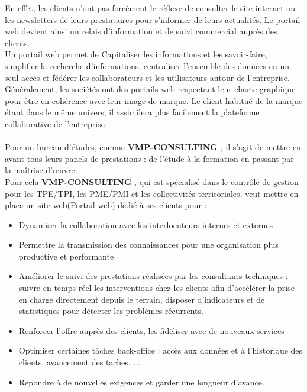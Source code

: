 \documentclass[12pt]{article}
\begin{document}
En effet, les clients n’ont pas forcément le réflexe de consulter le site internet ou les newsletters de leurs prestataires pour s’informer de leurs actualités. Le portail web devient ainsi un relais d’information et de suivi commercial auprès des clients.\\ Un portail web  permet de  Capitaliser les informations et les savoir-faire,
    simplifier la recherche d’informations,
    centraliser l’ensemble des données en un seul accès et
    fédérer les collaborateurs et les utilisateurs autour de l’entreprise.
\\
Généralement, les sociétés ont des portails web respectant leur charte graphique pour être en cohérence avec leur image de marque. Le client habitué de la marque étant dans le même univers, il assimilera plus facilement la plateforme collaborative de l’entreprise.\\

 \\
Pour un bureau d’études, comme \textbf{VMP-CONSULTING} , il s’agit de mettre en avant tous leurs panels de prestations : de l’étude à la formation en passant par la maîtrise d’œuvre.\\
Pour cela \textbf{VMP-CONSULTING} , qui est spécialisé dans le contrôle de gestion pour les TPE/TPI, les PME/PMI et les collectivités territoriales, veut mettre en place un site web(Portail web) dédié à ses clients pour :\\

\begin{itemize}

\item  Dynamiser la collaboration avec les interlocuteurs internes et externes
 \item   Permettre la transmission des connaissances pour une organisation plus productive et performante
 \item     Améliorer le suivi des prestations réalisées par les consultants techniques : suivre en temps réel les interventions chez les clients afin d’accélérer la prise en charge directement depuis le terrain, disposer d’indicateurs et de statistiques pour détecter les problèmes récurrents.
 
 \item   Renforcer  l'offre auprès des clients, les fidéliser avec de nouveaux services
 \item   Optimiser certaines tâches back-office : accès aux données et à l’historique des  clients, avancement des taches, ...
\item    Répondre à de nouvelles exigences et garder une longueur d’avance.

\end{itemize}
\end{document}
